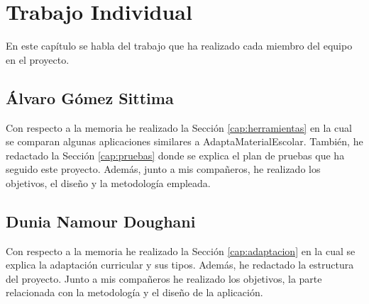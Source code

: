 \chapter{Trabajo Individual}
\label{cap:TrabajoIndividual}

En este capítulo se habla del trabajo que ha realizado cada miembro del equipo en el proyecto.

\section{Álvaro Gómez Sittima}
Con respecto a la memoria he realizado la Sección \ref{cap:herramientas} en la cual se comparan algunas aplicaciones similares a AdaptaMaterialEscolar. También, he redactado la Sección \ref{cap:pruebas} donde se explica el plan de pruebas que ha seguido este proyecto. Además, junto a mis compañeros, he realizado los objetivos, el diseño y la metodología empleada.

\section{Dunia Namour Doughani}
Con respecto a la memoria he realizado la Sección \ref{cap:adaptacion} en la cual se explica la adaptación curricular y sus tipos. Además, he redactado la estructura del proyecto. Junto a mis compañeros he realizado los objetivos, la parte relacionada con la metodología y el diseño de la aplicación.

